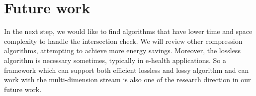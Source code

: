 \section{Future work}

In the next step, we would like to find algorithms that have lower time and
space complexity to handle the intersection check. We will review other
compression algorithms, attempting to achieve more energy savings. Moreover, the
lossless algorithm is necessary sometimes, typically in e-health applications. So
a framework which can support both efficient lossless and lossy algorithm and
can work with the multi-dimension stream is also one of the research
direction in our future work.
